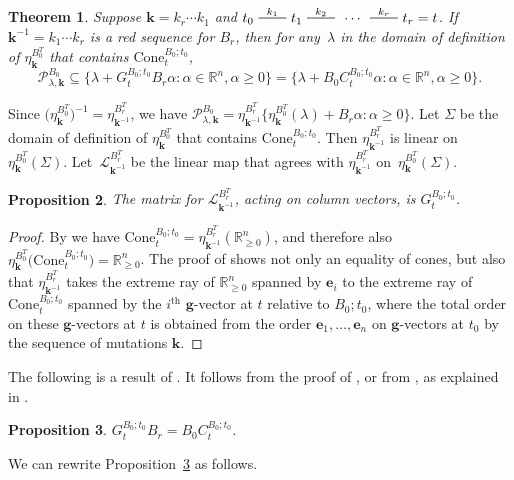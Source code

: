 \documentclass[10pt]{article}
\newtheorem{proposition}{Proposition}[section]
\newtheorem{theorem}[proposition]{Theorem}
\theoremstyle{definition}
\theoremstyle{remark}
\numberwithin{equation}{section}
\newcommand{\reals}{\mathbb R}
\newcommand{\edge}{\,\,\rule[2.7pt]{20pt}{0.5pt}\,\,}
\newcommand{\set}[1]{{\lbrace #1 \rbrace}}
\newcommand{\sett}[1]{{\bigl\lbrace #1 \bigr\rbrace}}
\renewcommand{\th}{^\text{th}}
\newcommand{\0}{{\mathbf{0}}}
\newcommand{\Cone}{\mathrm{Cone}}
\newcommand{\g}{\mathbf{g}}
\newcommand{\kk}{{\boldsymbol{k}}}
\newcommand{\e}{\mathbf{e}}
\renewcommand{\L}{\mathcal{L}}
\renewcommand{\P}{\mathcal{P}}
\renewcommand{\th}{^\text{th}}
\begin{document}
\begin{theorem}\label{P in B0C}
Suppose $\kk=k_r\cdots k_1$ and $t_0\overset{k_1}{\edge}t_1\overset{k_2}{\edge}\,\cdots\,\overset{k_r}{\edge}t_r=t$.
If~$\kk^{-1}=k_1\cdots k_r$ is a red sequence for $B_r$, then for any~$\lambda$ in the domain of definition of $\eta_\kk^{B_0^T}$ that contains $\Cone^{B_0;t_0}_t$,
\[\P^{B_0}_{\lambda,\kk}\subseteq\set{\lambda+G_t^{B_0;t_0}B_r\alpha:\alpha\in\reals^n,\alpha\ge0}=\set{\lambda+B_0C_t^{B_0;t_0}\alpha:\alpha\in\reals^n,\alpha\ge0}.\]
\end{theorem}

Since $\bigl(\eta_{\kk}^{B_0^T}\bigr)^{-1}=\eta_{\kk^{-1}}^{B_r^T}$, we have $\P^{B_0}_{\lambda,\kk}=\eta_{\kk^{-1}}^{B_r^T}\sett{\eta_\kk^{B_0^T}(\lambda)+B_r\alpha:\alpha\ge0}$.
Let $\Sigma$ be the domain of definition of $\eta_{\kk}^{B_0^T}$  that contains $\Cone^{B_0;t_0}_t$.
Then $\eta_{\kk^{-1}}^{B_r^T}$ is linear on~$\eta_{\kk}^{B_0^T}(\Sigma)$.
Let~$\L_{\kk^{-1}}^{B_r^T}$ be the linear map that agrees with $\eta_{\kk^{-1}}^{B_r^T}$ on~$\eta_{\kk}^{B_0^T}(\Sigma)$.

\begin{proposition}\label{L mat}
The matrix for $\L_{\kk^{-1}}^{B_r^T}$, acting on column vectors, is $G_t^{B_0;t_0}$.
\end{proposition}
\begin{proof}
By \cite[Proposition~8.13]{universal} we have $\Cone^{B_0;t_0}_t=\eta_{\kk^{-1}}^{B_r^T}(\reals_{\ge0}^n)$, and therefore also ${\eta_\kk^{B_0^T}\bigl(\Cone^{B_0;t_0}_t\bigr)=\reals_{\ge0}^n}$.
The proof of \cite[Proposition~8.13]{universal} shows not only an equality of cones, but also that $\eta_{\kk^{-1}}^{B_r^T}$ takes the extreme ray of $\reals_{\ge0}^n$ spanned by $\e_i$ to the extreme ray of $\Cone^{B_0;t_0}_t$ spanned by the $i\th$ $\g$-vector at $t$ relative to $B_0;t_0$, where the total order on these $\g$-vectors at $t$ is obtained from the order $\e_1,\ldots,\e_n$ on $\g$-vectors at $t_0$ by the sequence of mutations $\kk$.
\end{proof}

The following is a result of \cite{NZ}.
It follows from the proof of \cite[Proposition~1.3]{NZ}, or from \cite[(6.14)]{ca4}, as explained in \cite[Remark~2.1]{NZ}.

\begin{proposition}\label{GBBC}
$G_t^{B_0;t_0}B_r=B_0C_t^{B_0;t_0}$.
\end{proposition}

We can rewrite Proposition~\ref{GBBC} as follows.
\end{document}
